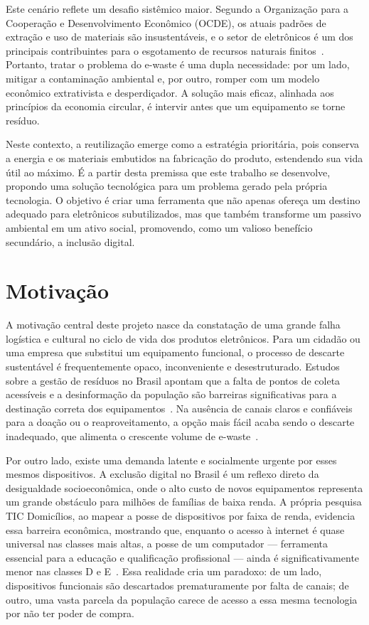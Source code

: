 \documentclass[
	12pt,				%
	openright,			%
	oneside,			%
	a4paper,			%
	english,			%
	brazil				%
	]{abntex2}
\theoremstyle{definition}
\begin{document}
Este cenário reflete um desafio sistêmico maior. Segundo a Organização para a Cooperação e Desenvolvimento Econômico (OCDE), os atuais padrões de extração e uso de materiais são insustentáveis, e o setor de eletrônicos é um dos principais contribuintes para o esgotamento de recursos naturais finitos~\cite{oecd2019}. Portanto, tratar o problema do e-waste é uma dupla necessidade: por um lado, mitigar a contaminação ambiental e, por outro, romper com um modelo econômico extrativista e desperdiçador. A solução mais eficaz, alinhada aos princípios da economia circular, é intervir antes que um equipamento se torne resíduo.

Neste contexto, a reutilização emerge como a estratégia prioritária, pois conserva a energia e os materiais embutidos na fabricação do produto, estendendo sua vida útil ao máximo. É a partir desta premissa que este trabalho se desenvolve, propondo uma solução tecnológica para um problema gerado pela própria tecnologia. O objetivo é criar uma ferramenta que não apenas ofereça um destino adequado para eletrônicos subutilizados, mas que também transforme um passivo ambiental em um ativo social, promovendo, como um valioso benefício secundário, a inclusão digital.

\section[Motivção]{Motivação}

A motivação central deste projeto nasce da constatação de uma grande falha logística e cultural no ciclo de vida dos produtos eletrônicos. Para um cidadão ou uma empresa que substitui um equipamento funcional, o processo de descarte sustentável é frequentemente opaco, inconveniente e desestruturado. Estudos sobre a gestão de resíduos no Brasil apontam que a falta de pontos de coleta acessíveis e a desinformação da população são barreiras significativas para a destinação correta dos equipamentos~\cite{GreenEletron2022}. Na ausência de canais claros e confiáveis para a doação ou o reaproveitamento, a opção mais fácil acaba sendo o descarte inadequado, que alimenta o crescente volume de e-waste~\cite{forti2024}.

Por outro lado, existe uma demanda latente e socialmente urgente por esses mesmos dispositivos. A exclusão digital no Brasil é um reflexo direto da desigualdade socioeconômica, onde o alto custo de novos equipamentos representa um grande obstáculo para milhões de famílias de baixa renda. A própria pesquisa TIC Domicílios, ao mapear a posse de dispositivos por faixa de renda, evidencia essa barreira econômica, mostrando que, enquanto o acesso à internet é quase universal nas classes mais altas, a posse de um computador — ferramenta essencial para a educação e qualificação profissional — ainda é significativamente menor nas classes D e E~\cite{cgi2024}. Essa realidade cria um paradoxo: de um lado, dispositivos funcionais são descartados prematuramente por falta de canais; de outro, uma vasta parcela da população carece de acesso a essa mesma tecnologia por não ter poder de compra.
\end{document}
